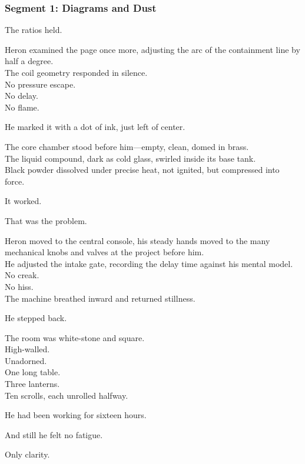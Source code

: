 \documentclass[9pt]{article}
\begin{document}
\newpage

\subsubsection*{Segment 1: Diagrams and Dust}

The ratios held.

Heron examined the page once more, adjusting the arc of the containment line by half a degree.\\
The coil geometry responded in silence.\\
No pressure escape.\\
No delay.\\
No flame.

He marked it with a dot of ink, just left of center.

The core chamber stood before him—empty, clean, domed in brass.\\
The liquid compound, dark as cold glass, swirled inside its base tank.\\
Black powder dissolved under precise heat, not ignited, but compressed into force.

It worked.

That was the problem.

\vspace{1em}

Heron moved to the central console, his steady hands moved to the many mechanical knobs and valves at the project before him.\\
He adjusted the intake gate, recording the delay time against his mental model.\\
No creak.\\
No hiss.\\
The machine breathed inward and returned stillness.

He stepped back.

\vspace{1em}

The room was white-stone and square.\\
High-walled.\\
Unadorned.\\
One long table.\\
Three lanterns.\\
Ten scrolls, each unrolled halfway.

He had been working for sixteen hours.

And still he felt no fatigue.

Only clarity.
\end{document}
